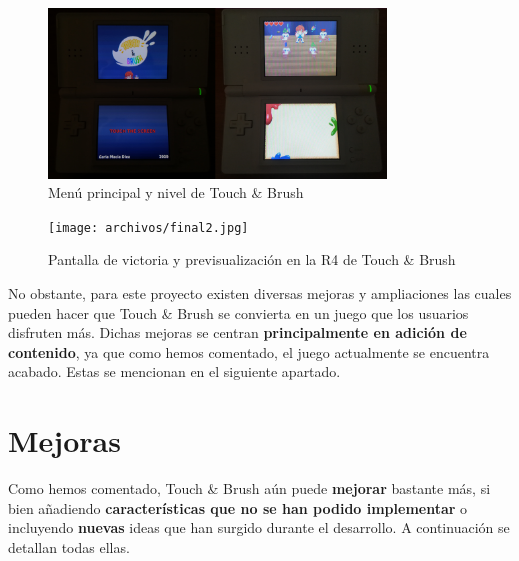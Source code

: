 \clearpage

\begin{figure}[htbp]
\centering
  \includegraphics[width=0.8\textwidth]{archivos/final1.jpg}
  \caption{Menú principal y nivel de Touch \& Brush}
  \label{fig:final1}
\end{figure}

\vspace{0.5cm}

\begin{figure}[htbp]
\centering
  \texttt{[image: archivos/final2.jpg]}
  \caption{Pantalla de victoria y previsualización en la R4 de Touch \& Brush}
  \label{fig:final2}
\end{figure}

\vspace{0.5cm}

No obstante, para este proyecto existen diversas mejoras y ampliaciones las cuales pueden hacer que Touch \& Brush se convierta en un juego que los usuarios disfruten más. Dichas mejoras se centran \textbf{principalmente en adición de contenido}, ya que como hemos comentado, el juego actualmente se encuentra acabado. Estas se mencionan en el siguiente apartado.

\vspace{1cm}

\section{Mejoras}

Como hemos comentado, Touch \& Brush aún puede \textbf{mejorar} bastante más, si bien añadiendo \textbf{características que no se han podido implementar} o incluyendo \textbf{nuevas} ideas que han surgido durante el desarrollo. A continuación se detallan todas ellas.

 \vspace{0.5cm}

